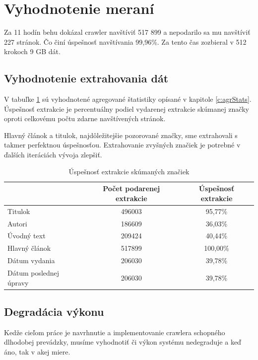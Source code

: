 \section{Vyhodnotenie meraní}
Za 11 hodín behu dokázal crawler navštíviť 517 899 a nepodarilo sa mu navštíviť 227 stránok. Čo činí úspešnosť navštívania 99,96\%. Za tento čas zozbieral v 512 krokoch 9 GB dát. 




\subsection{Vyhodnotenie extrahovania dát}
V tabuľke \ref{t:agrMer} sú vyhodnotené agregované štatistiky opísané v kapitole \ref{c:agrStats}. Úspešnosť extrakcie je percentuálny podiel vydarenej extrakcie skúmanej značky oproti celkovému počtu zdarne navštívených stránok. 

Hlavný článok a titulok, najdôležitejšie pozorované značky, sme extrahovali s takmer perfektnou úspešnosťou. Extrahovanie zvyšných značiek je potrebné v ďalších iteráciách vývoja zlepšiť. 




\begin{table}[!ht]
	\caption{Úspešnosť extrakcie skúmaných značiek}\label{t:agrMer}
	\smallskip
	\centering
    \begin{tabular}{|l|c|c|}
    \hline
        & Počet podarenej extrakcie & Úspešnosť extrakcie \\ \hline
        Titulok & 496003 & 95,77\% \\ \hline
        Autori & 186609 & 36,03\% \\ \hline
        Úvodný text & 209424 & 40,44\% \\ \hline
        Hlavný článok & 517899 & 100,00\% \\ \hline
        Dátum vydania & 206030 & 39,78\% \\ \hline
        Dátum poslednej úpravy & 206030 & 39,78\% \\ \hline
    \end{tabular}
\end{table}

\subsection{Degradácia výkonu} \label{c:perfDegr}
Kedže cieľom práce je navrhnutie a implementovanie crawlera schopného dlhodobej prevádzky, musíme vyhodnotiť či výkon systému nedegraduje a keď áno, tak v akej miere. 

